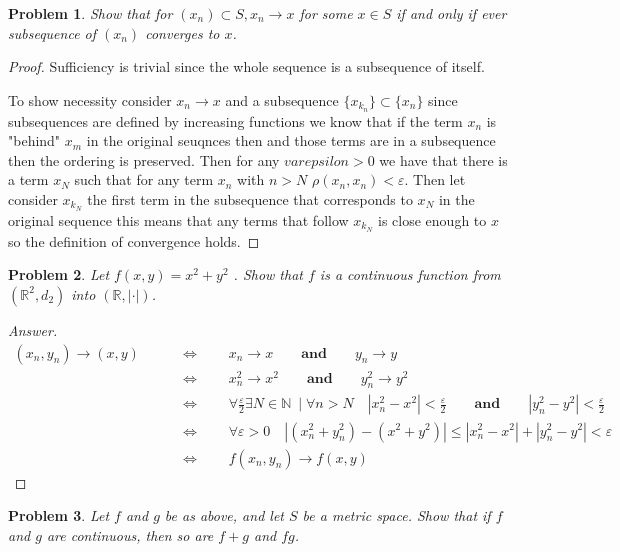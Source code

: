 \documentclass{article}
\newtheorem{problem}{Problem}[section]
\newcommand{\qiffq}{\qquad \iff \qquad}
\newcommand{\qaq}{\qquad \textbf{and} \qquad}
\begin{document}
\begin{problem}
    Show that for $\left(x_{n}\right) \subset S, x_{n} \rightarrow x$ for some $x \in S$ if and only if ever subsequence of $\left(x_{n}\right)$ converges to $x$.
\end{problem}

\begin{proof}
    Sufficiency is trivial since the whole sequence is a subsequence of itself.

    To show necessity consider $x_n\to x$ and a subsequence $\{x_{k_n}\}\subset\{x_{n}\}$ since subsequences are defined by increasing functions we know that if the term $x_n$ is "behind" $x_m$ in the original seuqnces then and those terms are in a subsequence then the ordering is preserved. Then for any $varepsilon>0$ we have that there is a term $x_N$ such that for any term  $x_n$ with $n>N$ $\rho(x_n, x_n)<\varepsilon$. Then let consider $x_{k_{N}}$ the first term in the subsequence that corresponds to $x_N$ in the original sequence this means that any terms that follow $x_{k_{N}}$ is close enough to $x$ so the definition of convergence holds.

\end{proof}

\begin{problem}
    Let $f ( x, y ) = x^2 + y^2$ . Show that $f$ is a continuous function from
    $(\mathbb{R}^2 , d_2 )$ into $(\mathbb{R} , | \cdot |)$.
    
\end{problem}

\begin{proof}[Answer]
    \begin{align*}
        (x_n,y_n)\to (x,y)  & \qiffq x_n \to x \qaq y_n \to y \\ &\qiffq x_n^2 \to x^2 \qaq y_n^2 \to y^2\\ 
                            &\qiffq \forall \frac{\varepsilon}{2} \exists N \in \mathbb{N}\:\mid \forall n>N \quad |x_n^2 - x^2|<\frac{\varepsilon}{2} \qaq |y_n^2 - y^2|<\frac{\varepsilon}{2}\\
                            &\qiffq \forall \varepsilon>0 \quad |(x_n^2+y_n^2) - (x^2+y^2)|\leq |x_n^2 - x^2| + |y_n^2 - y^2| < \varepsilon\\
                            &\qiffq f(x_n,y_n)\to f(x,y)
    \end{align*}
\end{proof}

\begin{problem}
    Let $f$ and $g$ be as above, and let $S$ be a metric space. Show that if $f$ and $g$ are continuous, then so are $f+g$ and $f g$.
\end{problem}
\end{document}
